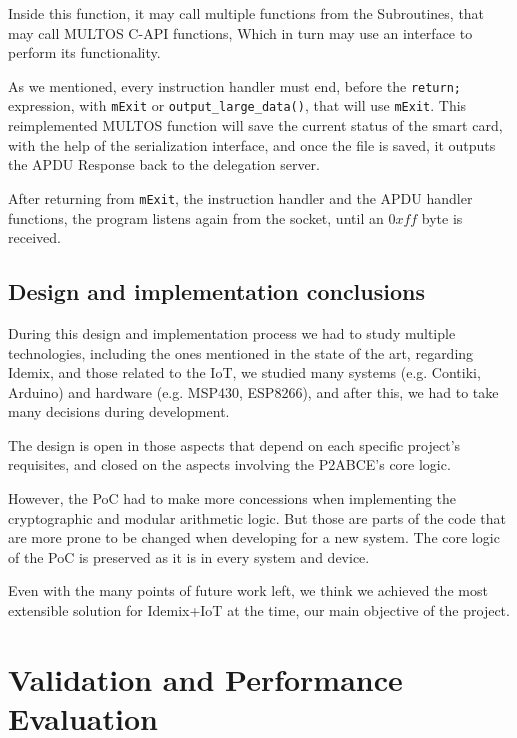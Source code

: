 \documentclass[journal]{IEEEtran}
\begin{document}
Inside this function, it may call multiple functions from the Subroutines, that may call MULTOS C-API functions, Which in turn may use an interface to perform its functionality.


As we mentioned, every instruction handler must end, before the \texttt{return;} expression, with \texttt{mExit} or  \texttt{output\_large\_data()}, that will use \texttt{mExit}. This reimplemented MULTOS function will save the current status of the smart card, with the help of the serialization interface, and once the file is saved, it outputs the APDU Response back to the delegation server.

After returning from \texttt{mExit}, the instruction handler and the APDU handler functions, the program listens again from the socket, until an $0xff$ byte is received.





\subsection{Design and implementation conclusions}

During this design and implementation process we had to study multiple technologies, including the ones mentioned in the state of the art, regarding Idemix, and those related to the IoT, we studied many systems (e.g. Contiki, Arduino) and hardware (e.g. MSP430, ESP8266), and after this, we had to take many decisions during development.

The design is open in those aspects that depend on each specific project's requisites, and closed on the aspects involving the P2ABCE's core logic.

However, the PoC had to make more concessions when implementing the cryptographic and modular arithmetic logic. But those are parts of the code that are more prone to be changed when developing for a new system. The core logic of the PoC is preserved as it is in every system and device.


Even with the many points of future work left, we think we achieved the most extensible solution for Idemix+IoT at the time, our main objective of the project.








\section{Validation and Performance Evaluation}\label{ch:validation}
\end{document}
